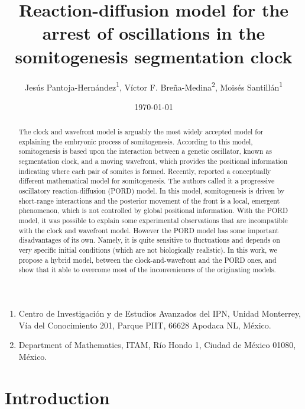 \documentclass[11pt]{article}
\title{Reaction-diffusion model for the arrest of oscillations in the
	somitogenesis segmentation clock}
\author{Jes\'us Pantoja-Hern\'andez\textsuperscript{1}, V\'ictor F. Bre\~na-Medina\textsuperscript{2}, Mois\'es Santill\'an\textsuperscript{1}}
\date{\today}
\begin{document}
	\maketitle
	
	
\begin{enumerate}
\item Centro de Investigaci\'on y de Estudios Avanzados del IPN, Unidad Monterrey, Vía del Conocimiento 201, Parque PIIT, 66628 Apodaca NL, México.
\item Department of Mathematics, ITAM, Río Hondo 1, Ciudad de México 01080, México.
\end{enumerate}

	\begin{abstract}
	The clock and wavefront model is arguably the most widely accepted model for explaining the embryonic process of somitogenesis. According to this model, somitogenesis is based upon the interaction between a genetic oscillator, known as segmentation clock, and a moving wavefront, which provides the positional information indicating where each pair of somites is formed. Recently, \citet{Cotterell2015} reported a conceptually different mathematical model for somitogenesis. The authors called it a progressive oscillatory reaction-diffusion (PORD) model. In this model, somitogenesis is driven by short-range interactions and the posterior movement of the front is a local, emergent phenomenon, which is not controlled by global positional information. With the PORD model, it was possible to explain some experimental observations that are incompatible with the clock and wavefront model. However the PORD model has some important disadvantages of its own. Namely, it is quite sensitive to fluctuations and depends on very specific initial conditions (which are not biologically realistic). In this work, we propose a hybrid model, between the clock-and-wavefront and the PORD ones, and show that it able to overcome most of the inconveniences of the originating models.
	\end{abstract}
	
	\section{Introduction}
	\label{intro}
	
\end{document}
